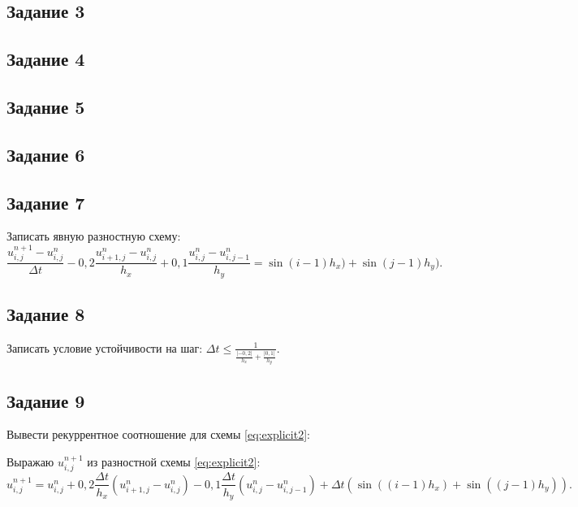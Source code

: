 \documentclass[12pt, a4paper]{report}
\begin{document}
	\subsection*{Задание 3}
	\large

	\subsection*{Задание 4}
	\large

	\subsection*{Задание 5}
	\large

	\subsection*{Задание 6}
	\large

	\subsection*{Задание 7}
	\large
	Записать явную разностную схему:
	\begin{equation}\label{eq:explicit2}
		\frac{u_{i, j}^{n+1} - u_{i, j}^{n}}{\Delta t} - 0,2\frac{u_{i+1, j}^{n} - u_{i, j}^{n}}{h_{x}} + 0,1\frac{u_{i, j}^{n} - u_{i, j-1}^{n}}{h_{y}} = \sin{(i-1)h_{x})} + \sin{(j-1)h_{y})}.
	\end{equation}

	\subsection*{Задание 8}
	\large
	Записать условие устойчивости на шаг: $\Delta t \le \frac{1}{\frac{\lvert -0,2 \rvert}{h_{x}} + \frac{\lvert 0,1 \rvert}{h_{y}}}$.

	\subsection*{Задание 9}
	\large
	Вывести рекуррентное соотношение для схемы \eqref{eq:explicit2}: \par
	Выражаю $u_{i, j}^{n+1}$ из разностной схемы \eqref{eq:explicit2}:
	\begin{equation*}
		u_{i, j}^{n+1} = u_{i, j}^{n} + 0,2\frac{\Delta t}{h_{x}}(u_{i+1, j}^{n} - u_{i, j}^{n}) - 0,1\frac{\Delta t}{h_{y}}(u_{i, j}^{n} - u_{i, j-1}^{n}) + \Delta t(\sin{((i-1)h_{x})} + \sin{((j-1)h_{y})}). 
	\end{equation*}
\end{document}
